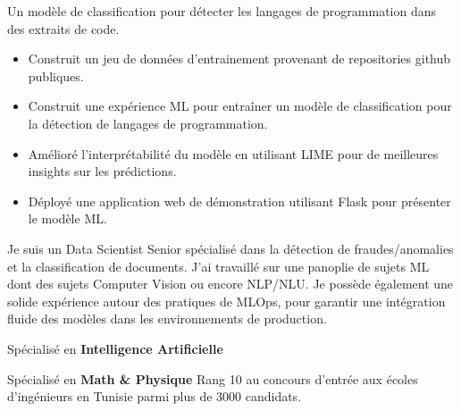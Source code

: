 \documentclass[10pt,letter,ragged2e,withhyper]{altacv}
\renewcommand{\divider}{\textcolor{body!30}{\hdashrule{\linewidth}{0.6pt}{0.5ex}}\medskip}
\begin{document}
\begin{paracol}{2}
\divider
{}

Un modèle de classification pour détecter les langages de programmation dans des extraits de code.

\begin{itemize}
      \item Construit un jeu de données d'entrainement provenant de repositories github publiques.
      \item Construit une expérience ML pour entraîner un modèle de classification pour la détection de langages de programmation.
      \item Amélioré l'interprétabilité du modèle en utilisant LIME pour de meilleures insights sur les prédictions.
      \item Déployé une application web de démonstration utilisant Flask pour présenter le modèle ML.
  \end{itemize}



\switchcolumn
{}
{\small
Je suis un Data Scientist Senior spécialisé dans la détection de fraudes/anomalies 
et la classification de documents. J'ai travaillé sur une panoplie de sujets ML 
dont des sujets Computer Vision ou encore NLP/NLU.
Je possède également une solide expérience autour des pratiques de MLOps,
pour garantir une intégration fluide des modèles dans les environnements de production.
}


{\small Spécialisé en \textbf{Intelligence Artificielle}}

\divider
{}
{\small Spécialisé en \textbf{Math \& Physique}}
{\small Rang 10 au concours d'entrée aux écoles d'ingénieurs en Tunisie parmi plus de 3000 candidats.}






\end{paracol}
\end{document}
